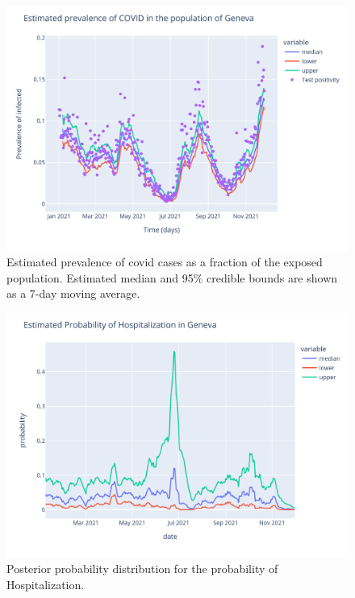 \documentclass[11pt]{article}
\begin{document}
    
\begin{figure}
 \centering
 \includegraphics[width=\linewidth]{prevalence_est.png}
 \caption{Estimated prevalence of covid cases as a fraction of the exposed population. Estimated median and 95\% credible bounds are shown as a 7-day moving average.}
 \label{fig:prev}
\end{figure}

\begin{figure}
 \centering
 \includegraphics[width=\linewidth]{phosp.png}
 \caption{Posterior probability distribution for the probability of Hospitalization.}
 \label{fig:phosp}
\end{figure}
\end{document}
